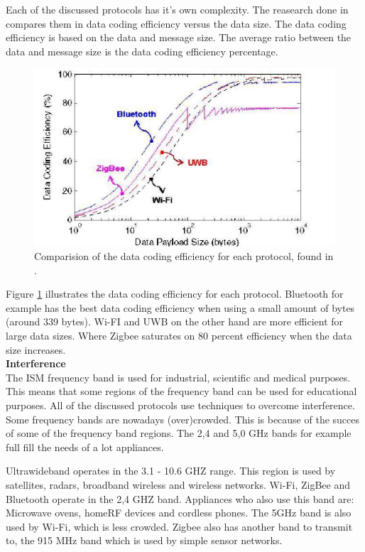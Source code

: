 \documentclass[10pt,a4paper]{article}
\begin{document}
Each of the discussed protocols has it's own complexity. The reasearch done in \cite{comparitivestudywirelessprotocols} compares them in data coding efficiency versus the data size. The data coding efficiency is based on the data and message size. The average ratio between the data and message size is the data coding efficiency percentage. 

\begin{figure}[H]
   \centering
   \includegraphics[width=1\textwidth]{datacodingefficieny}
   \caption{Comparision of the data coding efficiency for each protocol, found in \cite{comparitivestudywirelessprotocols}.}
   \label{fig:protocolefficiency}
\end{figure}

Figure \ref{fig:protocolefficiency} illustrates the data coding efficiency for each protocol. Bluetooth for example has the best data coding efficiency when using a small amount of bytes (around 339 bytes). Wi-FI and UWB on the other hand are more efficient for large data sizes. Where Zigbee saturates on 80 percent efficiency when the data size increases.\\

\textbf{Interference}\\
The ISM frequency band is used for industrial, scientific and medical purposes. This means that some regions of the frequency band can be used for educational purposes. All of the discussed protocols use techniques to overcome interference. Some frequency bands are nowadays (over)crowded. This is because of the succes of some of the frequency band regions. \cite{Bluetoothwifisurveyandcomparison} The 2,4 and 5,0 GHz bands for example full fill the needs of a lot appliances.

Ultrawideband operates in the 3.1 - 10.6 GHZ range. This region is used by satellites, radars, broadband wireless and wireless networks. Wi-Fi, ZigBee and Bluetooth operate in the 2,4 GHZ band. Appliances who also use this band are: Microwave ovens, homeRF devices and cordless phones. The 5GHz band is also used by Wi-Fi, which is less crowded. Zigbee also has another band to transmit to, the 915 MHz band which is used by simple sensor networks.
\end{document}
